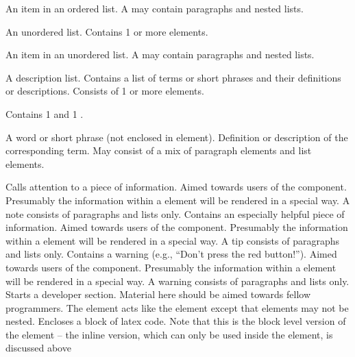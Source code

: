 \documentclass[11pt]{article}
\begin{document}
\begin{description}
\begin{description}
    \begin{description}
        An item in an ordered list.  A
       may contain paragraphs and nested lists.
    \end{description}
     An unordered list.  Contains 1 or
    more  elements.
    \begin{description}
        An item in an unordered list.  A
       may contain paragraphs and nested lists.
    \end{description}
     A description list.  Contains a list of terms or
    short phrases
    and their definitions or descriptions.  Consists of 1 or more 
    elements. 
    \begin{description}
       Contains 1  and 1
      . 
      \begin{description}
         A word or short phrase (not enclosed in
         element).
         Definition or description of the
        corresponding term.  May consist of a mix of paragraph elements and
        list elements.
      \end{description}
    \end{description}
      Calls attention to a piece of information.  Aimed
    towards users of the component.  Presumably the information within a
     element will be rendered in a special
    way.  A note consists of paragraphs and lists only.
     Contains an especially helpful piece of information.
    Aimed towards users of the component.  Presumably the information
    within a  element will be rendered in a special way.  A
    tip consists of paragraphs and lists only.
     Contains a warning (e.g., ``Don't press the red
    button!''). Aimed towards users of the component.  Presumably the
    information within a  element will be rendered in a
    special way.  A warning consists of paragraphs and lists only.
      Starts a developer section.  Material
    here should be aimed towards fellow programmers.  The
     element acts like the  element
    except that  elements may not be nested.
     Encloses a block of latex code.  Note that this is
    the block level version of the  element -- the inline
    version, which can only be used inside the  element, is
    discussed above
  \end{description}
\end{description}
\end{document}
